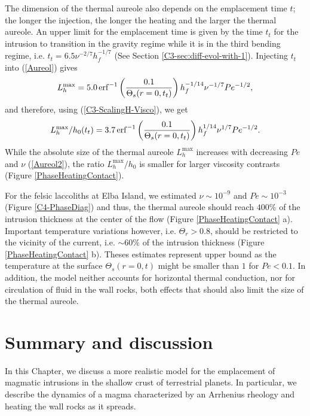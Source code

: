 The dimension of  the thermal aureole also depends  on the emplacement
time $t$;  the longer the  injection, the  longer the heating  and the
larger the thermal aureole. An upper limit for the emplacement time is
given by the time $t_t$ for the intrusion to transition in the gravity
regime   while   it   is   in   the   third   bending   regime,   i.e.
$t_t=6.5\nu^{-2/7}h_f^{-1/7}$               (See               Section
\ref{C3-sec:diff-evol-with-1}).   Injecting $t_t$  into (\ref{Aureol})
gives
\begin{equation}
  L_h^{\text{max}}                                                           =5.0  \operatorname{erf}^{-1}\left(\frac{0.1}{\Theta_s(r=0,t_{t})}\right)h_f^{-1/14}\nu^{-1/7}Pe^{-1/2},
  \label{Aureol2}
\end{equation}
and therefore, using (\ref{C3-ScalingH-Visco}), we get
\begin{equation}
  L_h^{\text{max}}/h_0(t_t)                                                           =3.7
  \operatorname{erf}^{-1}\left(\frac{0.1}{\Theta_s(r=0,t_{t})}\right)h_f^{1/14}\nu^{1/7}Pe^{-1/2}.
  \label{Aureol3}
\end{equation}
While  the absolute  size  of the  thermal aureole  $L^{\text{max}}_h$
increases with  decreasing $Pe$  and $\nu$ (\ref{Aureol2}),  the ratio
$L_h^{\text{max}}/h_0$  is  smaller  for  larger  viscosity  contrasts
(Figure \ref{PhaseHeatingContact}).

For   the   felsic   laccoliths   at   Elba   Island,   we   estimated
$\nu \sim  10^{-9}$ and  $Pe\sim 10^{-3}$  (Figure \ref{C4-PhaseDiag})
and thus,  the thermal aureole  should reach $400\%$ of  the intrusion
thickness at the center  of the flow (Figure \ref{PhaseHeatingContact}
a).  Important temperature  variations  however, i.e.  $\Theta_r>0.8$,
should be restricted to the vicinity of the current, i.e.  $\sim 60\%$
of  the  intrusion  thickness  (Figure  \ref{PhaseHeatingContact}  b).
Theses  estimates represent  upper  bound as  the  temperature at  the
surface $\Theta_s(r=0,t)$ might be smaller  than $1$ for $Pe<0.1$.  In
addition,   the  model   neither  accounts   for  horizontal   thermal
conduction,  nor for  circulation of  fluid  in the  wall rocks,  both
effects that should also limit the size of the thermal aureole.


\section{Summary and discussion}
\label{C4-sec:discussion}

In this Chapter, we discuss a more realistic model for the emplacement
of magmatic intrusions in the shallow crust of terrestrial planets. In
particular, we  describe the dynamics  of a magma characterized  by an
Arrhenius rheology and heating the wall rocks as it spreads.

